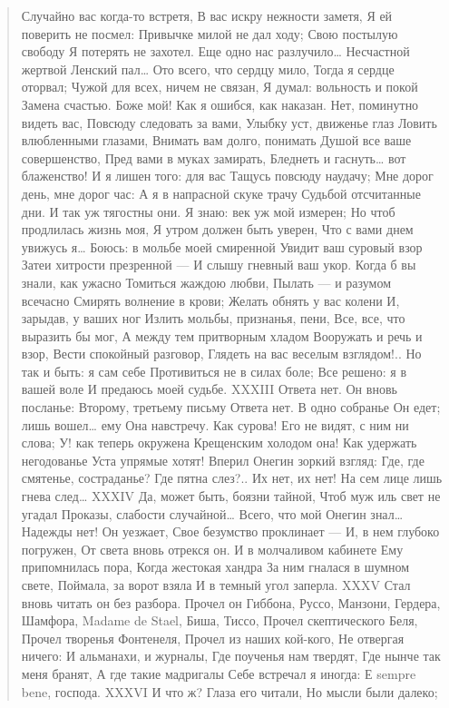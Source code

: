 \begin{verse}
Случайно вас когда-то встретя,
В вас искру нежности заметя,
Я ей поверить не посмел:
Привычке милой не дал ходу;
Свою постылую свободу
Я потерять не захотел.
Еще одно нас разлучило…
Несчастной жертвой Ленский пал…
Ото всего, что сердцу мило,
Тогда я сердце оторвал;
Чужой для всех, ничем не связан,
Я думал: вольность и покой
Замена счастью. Боже мой!
Как я ошибся, как наказан.
Нет, поминутно видеть вас,
Повсюду следовать за вами,
Улыбку уст, движенье глаз
Ловить влюбленными глазами,
Внимать вам долго, понимать
Душой все ваше совершенство,
Пред вами в муках замирать,
Бледнеть и гаснуть… вот блаженство!
И я лишен того: для вас
Тащусь повсюду наудачу;
Мне дорог день, мне дорог час:
А я в напрасной скуке трачу
Судьбой отсчитанные дни.
И так уж тягостны они.
Я знаю: век уж мой измерен;
Но чтоб продлилась жизнь моя,
Я утром должен быть уверен,
Что с вами днем увижусь я…
Боюсь: в мольбе моей смиренной
Увидит ваш суровый взор
Затеи хитрости презренной —
И слышу гневный ваш укор.
Когда б вы знали, как ужасно
Томиться жаждою любви,
Пылать — и разумом всечасно
Смирять волнение в крови;
Желать обнять у вас колени
И, зарыдав, у ваших ног
Излить мольбы, признанья, пени,
Все, все, что выразить бы мог,
А между тем притворным хладом
Вооружать и речь и взор,
Вести спокойный разговор,
Глядеть на вас веселым взглядом!..
Но так и быть: я сам себе
Противиться не в силах боле;
Все решено: я в вашей воле
И предаюсь моей судьбе.
XXXIII
Ответа нет. Он вновь посланье:
Второму, третьему письму
Ответа нет. В одно собранье
Он едет; лишь вошел… ему
Она навстречу. Как сурова!
Его не видят, с ним ни слова;
У! как теперь окружена
Крещенским холодом она!
Как удержать негодованье
Уста упрямые хотят!
Вперил Онегин зоркий взгляд:
Где, где смятенье, состраданье?
Где пятна слез?.. Их нет, их нет!
На сем лице лишь гнева след…
XXXIV
Да, может быть, боязни тайной,
Чтоб муж иль свет не угадал
Проказы, слабости случайной…
Всего, что мой Онегин знал…
Надежды нет! Он уезжает,
Свое безумство проклинает —
И, в нем глубоко погружен,
От света вновь отрекся он.
И в молчаливом кабинете
Ему припомнилась пора,
Когда жестокая хандра
За ним гналася в шумном свете,
Поймала, за ворот взяла
И в темный угол заперла.
XXXV
Стал вновь читать он без разбора.
Прочел он Гиббона, Руссо,
Манзони, Гердера, Шамфора,
Madame de Stael, Биша, Тиссо,
Прочел скептического Беля,
Прочел творенья Фонтенеля,
Прочел из наших кой-кого,
Не отвергая ничего:
И альманахи, и журналы,
Где поученья нам твердят,
Где нынче так меня бранят,
А где такие мадригалы
Себе встречал я иногда:
Е sempre bene, господа.
XXXVI
И что ж? Глаза его читали,
Но мысли были далеко;

\end{verse}

